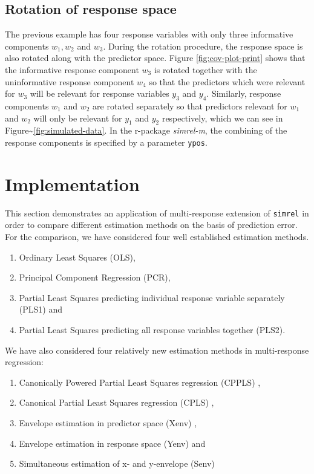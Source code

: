 \documentclass[3p,times,12pt,authoryear]{elsarticle}
\providecommand{\tightlist}{%
  \setlength{\itemsep}{0pt}\setlength{\parskip}{0pt}}
\theoremstyle{definition}
\theoremstyle{definition}
\theoremstyle{remark}
\begin{document}
\hypertarget{rotation-of-response-space}{\subsection{Rotation of
response space}\label{rotation-of-response-space}}

The previous example has four response variables with only three
informative components \(w_1, w_2\) and \(w_3\). During the rotation
procedure, the response space is also rotated along with the predictor
space. Figure \ref{fig:cov-plot-print} shows that the informative
response component \(w_3\) is rotated together with the uninformative
response component \(w_4\) so that the predictors which were relevant
for \(w_3\) will be relevant for response variables \(y_3\) and \(y_4\).
Similarly, response components \(w_1\) and \(w_2\) are rotated
separately so that predictors relevant for \(w_1\) and \(w_2\) will only
be relevant for \(y_1\) and \(y_2\) respectively, which we can see in
Figure\textasciitilde{}\ref{fig:simulated-data}. In the r-package
\emph{simrel-m}, the combining of the response components is specified
by a parameter \texttt{ypos}.

\hypertarget{implementation}{\section{Implementation}\label{implementation}}

This section demonstrates an application of multi-response extension of
\texttt{simrel} in order to compare different estimation methods on the
basis of prediction error. For the comparison, we have considered four
well established estimation methods.

\begin{enumerate}
\def\labelenumi{\alph{enumi})}
\tightlist
\item
  Ordinary Least Squares (OLS),
\item
  Principal Component Regression (PCR),
\item
  Partial Least Squares predicting individual response variable
  separately (PLS1) and
\item
  Partial Least Squares predicting all response variables together
  (PLS2).
\end{enumerate}

We have also considered four relatively new estimation methods in
multi-response regression:

\begin{enumerate}
\def\labelenumi{\alph{enumi})}
\tightlist
\item
  Canonically Powered Partial Least Squares regression (CPPLS)
  \citep{indahl2009canonical},
\item
  Canonical Partial Least Squares regression (CPLS)
  \citep{indahl2009canonical},
\item
  Envelope estimation in predictor space (Xenv)
  \citep{cook2010envelope},
\item
  Envelope estimation in response space (Yenv)
  \citep{cook2015foundations} and
\item
  Simultaneous estimation of x- and y-envelope (Senv)
  \citep{cook2015simultaneous}
\end{enumerate}
\end{document}
